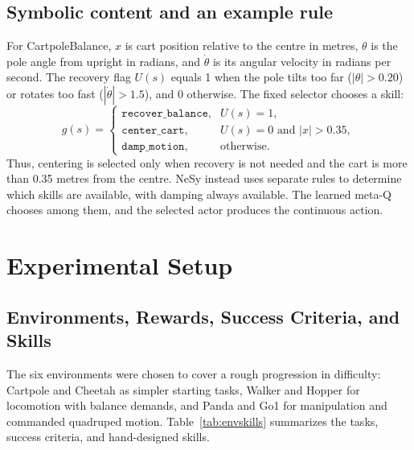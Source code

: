 \documentclass[conference,letterpaper,10pt]{IEEEtran}
\begin{document}
\subsection{Symbolic content and an example rule}
For CartpoleBalance, $x$ is cart position relative to the centre in metres, $\theta$ is the pole angle from upright in radians, and $\dot{\theta}$ is its angular velocity in radians per second. The recovery flag $U(s)$ equals 1 when the pole tilts too far ($|\theta|>0.20$) or rotates too fast ($|\dot{\theta}|>1.5$), and 0 otherwise. The fixed selector chooses a skill:
\begin{equation}
g(s)=
\begin{cases}
\texttt{recover\_balance}, & U(s)=1,\\
\texttt{center\_cart}, & U(s)=0 \text{ and } |x|>0.35,\\
\texttt{damp\_motion}, & \text{otherwise}.
\end{cases}
\label{eq:cartpolerule}
\end{equation}
Thus, centering is selected only when recovery is not needed and the cart is more than 0.35 metres from the centre. NeSy instead uses separate rules to determine which skills are available, with damping always available. The learned meta-Q chooses among them, and the selected actor produces the continuous action.

\section{Experimental Setup}
\subsection{Environments, Rewards, Success Criteria, and Skills}\label{sec:envskills}
The six environments were chosen to cover a rough progression in difficulty: Cartpole and Cheetah as simpler starting tasks, Walker and Hopper for locomotion with balance demands, and Panda and Go1 for manipulation and commanded quadruped motion. Table~\ref{tab:envskills} summarizes the tasks, success criteria, and hand-designed skills.
\end{document}
